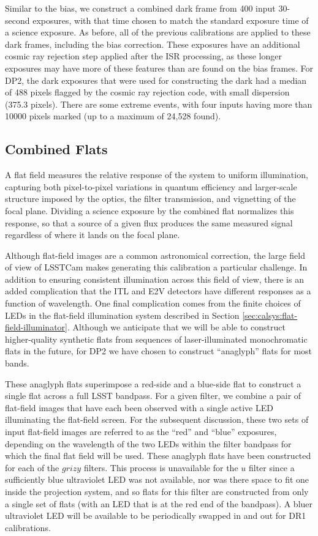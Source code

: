 Similar to the bias, we construct a combined dark frame from 400 input 30-second exposures, with that time chosen to match the standard exposure time of a science exposure.
As before, all of the previous calibrations are applied to these dark frames, including the bias correction.
These exposures have an additional cosmic ray rejection step applied after the ISR processing, as these longer exposures may have more of these features than are found on the bias frames.
For DP2, the dark exposures that were used for constructing the dark had a median of 488 pixels flagged by the cosmic ray rejection code, with small dispersion (375.3 pixels).
There are some extreme events, with four inputs having more than 10000 pixels marked (up to a maximum of 24,528 found).

\subsection{Combined Flats} \label{sec:calibration-production:flats}

A flat field measures the relative response of the system to uniform illumination, capturing both pixel-to-pixel variations in quantum efficiency and larger-scale structure imposed by the optics, the filter transmission, and vignetting of the focal plane.
Dividing a science exposure by the combined flat normalizes this response, so that a source of a given flux produces the same measured signal regardless of where it lands on the focal plane.

Although flat-field images are a common astronomical correction, the large field of view of LSSTCam makes generating this calibration a particular challenge.
In addition to ensuring consistent illumination across this field of view, there is an added complication that the ITL and E2V detectors have different responses as a function of wavelength.
One final complication comes from the finite choices of LEDs in the flat-field illumination system described in Section \ref{sec:calsys:flat-field-illuminator}.
Although we anticipate that we will be able to construct higher-quality synthetic flats from sequences of laser-illuminated monochromatic flats in the future, for DP2 we have chosen to construct ``anaglyph'' flats for most bands.

These anaglyph flats superimpose a red-side and a blue-side flat to construct a single flat across a full LSST bandpass. For a given filter, we combine a pair of flat-field images that have each been observed with a single active LED illuminating the flat-field screen.
For the subsequent discussion, these two sets of input flat-field images are referred to as the ``red'' and ``blue'' exposures, depending on the wavelength of the two LEDs within the filter bandpass for which the final flat field will be used.
These anaglyph flats have been constructed for each of the $grizy$ filters.
This process is unavailable for the $u$ filter since a sufficiently blue ultraviolet LED was not available, nor was there space to fit one inside the projection system, and so flats for this filter are constructed from only a single set of flats (with an LED that is at the red end of the bandpass).
A bluer ultraviolet LED will be available to be periodically swapped in and out for DR1 calibrations.

